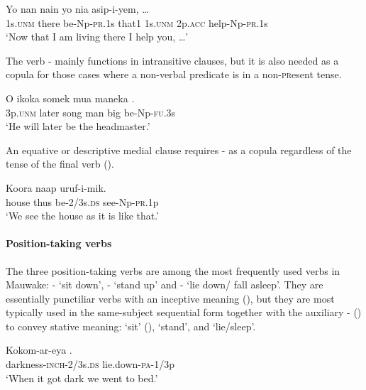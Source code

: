 \ea%
\label{ex:x265}
\gll Yo nan  nain yo nia asip-i-yem, {\dots} \\
1s.\textsc{unm} there be-Np-\textsc{pr}.1s that1 1s.\textsc{unm} 2p.\textsc{acc} help-Np-\textsc{pr}.1s\\
\glt`Now that I am living there I help you, {\dots}'
\z

The verb - mainly functions in intransitive clauses, but it is also needed as a copula for those cases where a non-verbal predicate is in a non-\textsc{pr}esent tense. 

\ea%
\label{ex:x969}
\gll O ikoka somek mua maneka . \\
3p.\textsc{unm} later song man big be-Np-\textsc{fu}.3s\\
\glt`He will later be the headmaster.'
\z

An equative or descriptive medial clause requires - as a copula regardless of the tense of the final verb ().

\ea%
\label{ex:x498}
\gll Koora naap  uruf-i-mik. \\
house thus be-2/3s.\textsc{ds} see-Np-\textsc{pr}.1p\\
\glt`We see the house as it is like that.'
\z

\paragraph[Position-taking verbs]{Position-taking verbs}
{}
The three position-taking verbs are among the most frequently used verbs in Mauwake: - `sit down', - `stand up' and - `lie down/ fall asleep'. They are essentially punctiliar verbs with an inceptive meaning (), but they are most typically used in the same-subject sequential form together with the auxiliary - () to convey stative meaning: `sit' (), `stand', and `lie/sleep'.

\ea%
\label{ex:x273}
\gll Kokom-ar-eya . \\
darkness-\textsc{inch}-2/3s.\textsc{ds} lie.down-\textsc{pa}-1/3p \\
\glt`When it got dark we went to bed.'
\z

